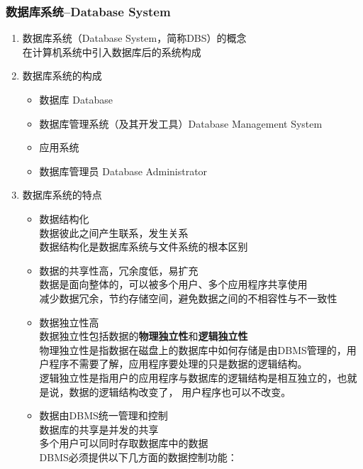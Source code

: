 \subsubsection{数据库系统–Database System}
\begin{enumerate}
\item 数据库系统（Database System，简称DBS）的概念\\
在计算机系统中引入数据库后的系统构成

\item 数据库系统的构成\\
\begin{itemize}
\item 数据库 Database
\item 数据库管理系统（及其开发工具）Database Management System
\item 应用系统
\item 数据库管理员 Database Administrator
\end{itemize}

\item 数据库系统的特点

\begin{itemize}
\item 数据结构化\\
数据彼此之间产生联系，发生关系\\
数据结构化是数据库系统与文件系统的根本区别\\

\item 数据的共享性高，冗余度低，易扩充\\
数据是面向整体的，可以被多个用户、多个应用程序共享使用\\
减少数据冗余，节约存储空间，避免数据之间的不相容性与不一致性\\

\item 数据独立性高\\
数据独立性包括数据的\textbf{物理独立性}和\textbf{逻辑独立性}\\
物理独立性是指数据在磁盘上的数据库中如何存储是由DBMS管理的，用户程序不需要了解，应用程序要处理的只是数据的逻辑结构。\\
逻辑独立性是指用户的应用程序与数据库的逻辑结构是相互独立的，也就是说，数据的逻辑结构改变了， 用户程序也可以不改变。\\

\item 数据由DBMS统一管理和控制\\

数据库的共享是并发的共享\\
多个用户可以同时存取数据库中的数据\\
DBMS必须提供以下几方面的数据控制功能：\\


\end{itemize}
\end{enumerate}
